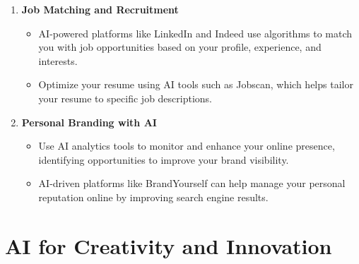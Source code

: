 \documentclass[
  letterpaper,
  DIV=11,
  numbers=noendperiod]{scrreprt}
\providecommand{\tightlist}{%
  \setlength{\itemsep}{0pt}\setlength{\parskip}{0pt}}\usepackage{longtable,booktabs,array}
\begin{document}
\begin{enumerate}
\def\labelenumi{\arabic{enumi}.}
\item
  \textbf{Job Matching and Recruitment}

  \begin{itemize}
  \tightlist
  \item
    AI-powered platforms like LinkedIn and Indeed use algorithms to
    match you with job opportunities based on your profile, experience,
    and interests.
  \item
    Optimize your resume using AI tools such as Jobscan, which helps
    tailor your resume to specific job descriptions.
  \end{itemize}
\item
  \textbf{Personal Branding with AI}

  \begin{itemize}
  \tightlist
  \item
    Use AI analytics tools to monitor and enhance your online presence,
    identifying opportunities to improve your brand visibility.
  \item
    AI-driven platforms like BrandYourself can help manage your personal
    reputation online by improving search engine results.
  \end{itemize}
\end{enumerate}

\section{AI for Creativity and
Innovation}\label{ai-for-creativity-and-innovation}
\end{document}
